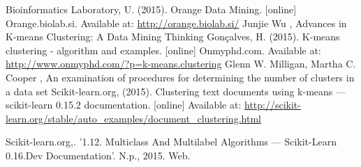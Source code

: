 \documentclass[12pt]{article}
\begin{document}
\begin{thebibliography}{99}
Bioinformatics Laboratory, U. (2015). Orange Data Mining. [online] Orange.biolab.si. Available at: \url{http://orange.biolab.si/} 
 Junjie Wu , Advances in K-means Clustering: A Data Mining Thinking
Gonçalves, H. (2015). K-means clustering - algorithm and examples. [online] Onmyphd.com. Available at: \url{http://www.onmyphd.com/?p=k-means.clustering}
    Glenn W. Milligan, Martha C. Cooper , An examination of procedures for determining the number of clusters in a data set
Scikit-learn.org, (2015). Clustering text documents using k-means — scikit-learn 0.15.2 documentation. [online] Available at: \url{http://scikit-learn.org/stable/auto_examples/document_clustering.html} 

Scikit-learn.org,. '1.12. Multiclass And Multilabel Algorithms — Scikit-Learn 0.16.Dev Documentation'. N.p., 2015. Web. 
 
\end{thebibliography}
\end{document}
